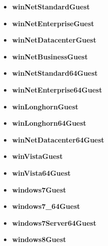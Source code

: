 \begin{itemize}
\item \textbf{winNetStandardGuest} 
\end{itemize}
\begin{itemize}
\item \textbf{winNetEnterpriseGuest} 
\end{itemize}
\begin{itemize}
\item \textbf{winNetDatacenterGuest} 
\end{itemize}
\begin{itemize}
\item \textbf{winNetBusinessGuest} 
\end{itemize}
\begin{itemize}
\item \textbf{winNetStandard64Guest} 
\end{itemize}
\begin{itemize}
\item \textbf{winNetEnterprise64Guest} 
\end{itemize}
\begin{itemize}
\item \textbf{winLonghornGuest} 
\end{itemize}
\begin{itemize}
\item \textbf{winLonghorn64Guest} 
\end{itemize}
\begin{itemize}
\item \textbf{winNetDatacenter64Guest} 
\end{itemize}
\begin{itemize}
\item \textbf{winVistaGuest} 
\end{itemize}
\begin{itemize}
\item \textbf{winVista64Guest} 
\end{itemize}
\begin{itemize}
\item \textbf{windows7Guest} 
\end{itemize}
\begin{itemize}
\item \textbf{windows7\_64Guest} 
\end{itemize}
\begin{itemize}
\item \textbf{windows7Server64Guest} 
\end{itemize}
\begin{itemize}
\item \textbf{windows8Guest} 
\end{itemize}
